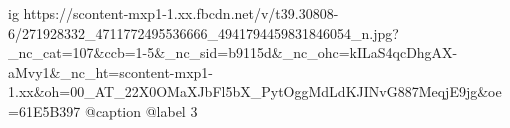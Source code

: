  
 
 
 
 

\ifcmt
  ig https://scontent-mxp1-1.xx.fbcdn.net/v/t39.30808-6/271928332_4711772495536666_4941794459831846054_n.jpg?_nc_cat=107&ccb=1-5&_nc_sid=b9115d&_nc_ohc=kILaS4qcDhgAX-aMvy1&_nc_ht=scontent-mxp1-1.xx&oh=00_AT_22X0OMaXJbFl5bX_PytOggMdLdKJINvG887MeqjE9jg&oe=61E5B397
  @caption @label 3
\fi
